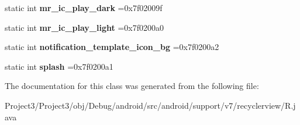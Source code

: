 \begin{DoxyCompactItemize}
static int {\bfseries mr\+\_\+ic\+\_\+play\+\_\+dark} =0x7f02009f
\item 
\mbox{\label{classandroid_1_1support_1_1v7_1_1recyclerview_1_1R_1_1drawable_a5506ec3f56de522d4789db4ef8328d1f}} 
static int {\bfseries mr\+\_\+ic\+\_\+play\+\_\+light} =0x7f0200a0
\item 
\mbox{\label{classandroid_1_1support_1_1v7_1_1recyclerview_1_1R_1_1drawable_acd019118f877d962cb671ea756f2be77}} 
static int {\bfseries notification\+\_\+template\+\_\+icon\+\_\+bg} =0x7f0200a2
\item 
\mbox{\label{classandroid_1_1support_1_1v7_1_1recyclerview_1_1R_1_1drawable_ada0813d8f5d29e82dd2ca705a3bc0915}} 
static int {\bfseries splash} =0x7f0200a1
\end{DoxyCompactItemize}


The documentation for this class was generated from the following file\+:\begin{DoxyCompactItemize}
\item 
Project3/\+Project3/obj/\+Debug/android/src/android/support/v7/recyclerview/R.\+java\end{DoxyCompactItemize}
